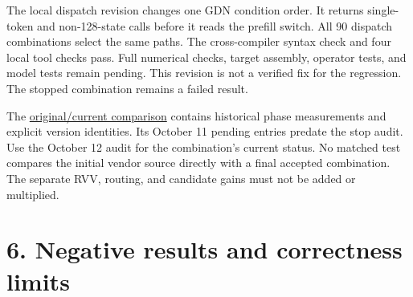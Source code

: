 \documentclass[10pt,a4paper]{article}
\begin{document}
The local dispatch revision changes one GDN condition order. It returns
single-token and non-128-state calls before it reads the prefill switch.
All 90 dispatch combinations select the same paths. The cross-compiler
syntax check and four local tool checks pass. Full numerical checks,
target assembly, operator tests, and model tests remain pending. This
revision is not a verified fix for the regression. The stopped
combination remains a failed result.

The
\href{https://github.com/MoyaMryia/riscv-accl/blob/main/spacemit/reports/2026-10-11-original-current-comparison.md}{original/current
comparison} contains historical phase measurements and explicit version
identities. Its October 11 pending entries predate the stop audit. Use
the October 12 audit for the combination's current status. No matched
test compares the initial vendor source directly with a final accepted
combination. The separate RVV, routing, and candidate gains must not be
added or multiplied.

\hypertarget{negative-results-and-correctness-limits}{%
\section{6. Negative results and correctness
limits}\label{negative-results-and-correctness-limits}}
\end{document}
